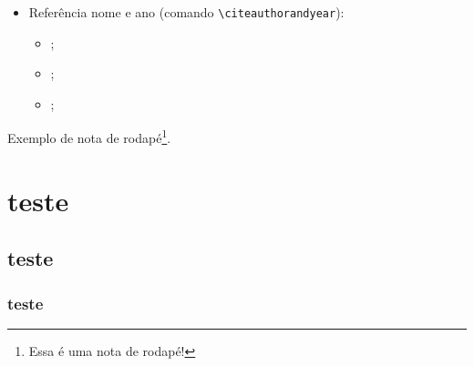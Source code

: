 \begin{itemize}
\begin{itemize}
        \item \cite{Agaisse1995, Abedi2014};
        \item \cite{Nelson2014, BtNomenclature2016, AgapitoTenfen2014};
    \end{itemize}
    \item Referência nome e ano (comando \verb|\citeauthorandyear|):
    \begin{itemize}
        \item {};
        \item {};
        \item {};
    \end{itemize}
\end{itemize}


Exemplo de nota de rodapé\footnote{Essa é uma nota de rodapé!}.

\section{teste}
\subsection{teste}
\subsubsection{teste}

